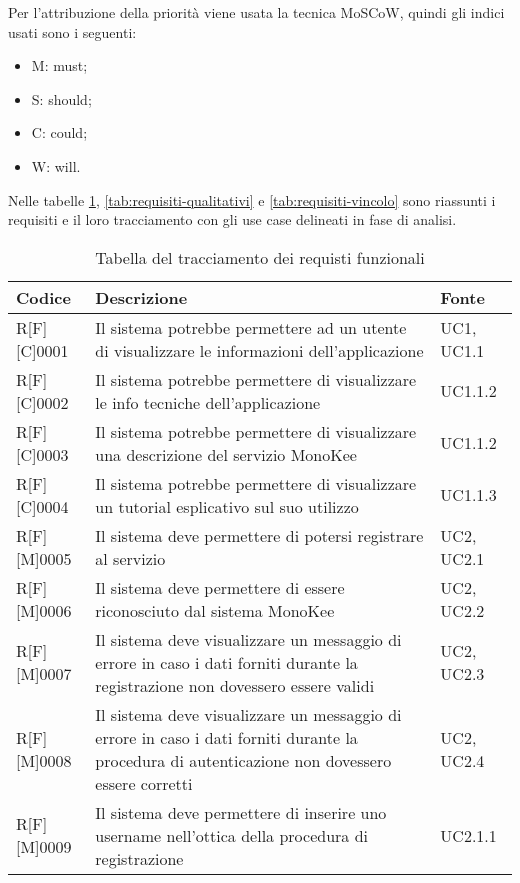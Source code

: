 Per l’attribuzione della priorità viene usata la tecnica MoSCoW, quindi gli indici usati sono i seguenti:
\begin{itemize}
    \item M: must;
    \item S: should; 
    \item C: could; 
    \item W: will.
\end{itemize} 
    
Nelle tabelle \ref{tab:requisiti-funzionali}, \ref{tab:requisiti-qualitativi} e \ref{tab:requisiti-vincolo} sono riassunti i requisiti e il loro tracciamento con gli use case delineati in fase di analisi.

\newpage
\begin{center}
\begin{longtable}{|p{2cm}|p{9cm}|p{2cm}|}%
\caption{Tabella del tracciamento dei requisti funzionali}
\label{tab:requisiti-funzionali}
\endfirsthead
\endhead
\hline
\textbf{Codice} & \textbf{Descrizione} & \textbf{Fonte}\\
\hline
R[F][C]0001     & Il sistema potrebbe permettere ad un utente di visualizzare le informazioni dell’applicazione & UC1, UC1.1 \\
\hline
R[F][C]0002     & Il sistema potrebbe permettere di visualizzare le info tecniche dell’applicazione & UC1.1.2 \\
\hline
R[F][C]0003     & Il sistema potrebbe permettere di visualizzare una descrizione del servizio MonoKee & UC1.1.2 \\
\hline
R[F][C]0004     & Il sistema potrebbe permettere di visualizzare un tutorial esplicativo sul suo utilizzo & UC1.1.3 \\
\hline
R[F][M]0005     & Il sistema deve permettere di potersi registrare al servizio & UC2, UC2.1 \\
\hline
R[F][M]0006     & Il sistema deve permettere di essere riconosciuto dal sistema MonoKee & UC2, UC2.2 \\
\hline
R[F][M]0007     & Il sistema deve visualizzare un messaggio di errore in caso i dati forniti durante la registrazione non dovessero essere validi & UC2, UC2.3 \\
\hline
R[F][M]0008     & Il sistema deve visualizzare un messaggio di errore in caso i dati forniti durante la procedura di autenticazione non dovessero essere corretti & UC2, UC2.4 \\
\hline
R[F][M]0009     & Il sistema deve permettere di inserire uno username nell’ottica della procedura di registrazione  & UC2.1.1\\

\end{longtable}
\end{center}
